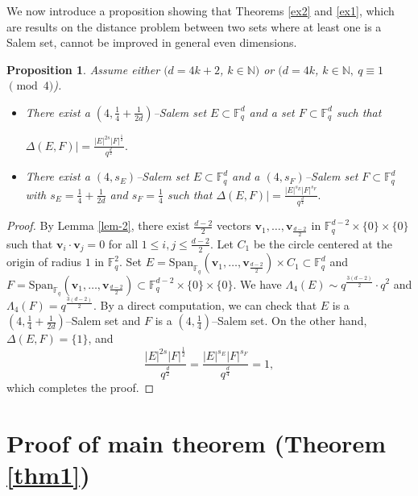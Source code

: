 \documentclass[11pt]{article}
\newtheorem{proposition}[theorem]{Proposition}
\begin{document}
We now introduce a proposition showing that Theorems \ref{ex2} and \ref{ex1}, which are results on the distance problem between two sets where at least one is a Salem set, cannot be improved in general even dimensions.
\begin{proposition}\label{sharptwoset}
      Assume either $(d=4k+2$, $k \in \mathbb{N})$ or $(d=4k$, $k \in \mathbb{N}, ~q \equiv 1$ $\pmod{4}$). 
    \begin{itemize}
        \item There exist a $\left(4, \frac{1}{4}+\frac{1}{2d}\right)$--Salem set $E\subset \mathbb{F}_q^d$ and a set $F\subset \mathbb{F}_q^d$ such that

        $\Delta(E, F)|=\frac{|E|^{2s}|F|^{\frac{1}{2}}}{q^{\frac{d}{2}}}.$
        \item There exist a $\left(4, s_E\right)$--Salem set $E\subset \mathbb{F}_q^d$ and a $\left(4, s_F\right)$--Salem set $F\subset \mathbb{F}_q^d$ with $s_E=\frac{1}{4}+\frac{1}{2d}$ and $s_F=\frac{1}{4}$
        such that
        $\Delta(E, F)|=\frac{|E|^{s_E}|F|^{s_F}}{q^{\frac{d}{4}}}.$
    \end{itemize}
\end{proposition}

\begin{proof}
   By Lemma \ref{lem-2}, there exist $\frac{d-2}{2}$ vectors $\mathbf{v}_1, \ldots, \mathbf{v}_{\frac{d-2}{2}}$ in $\mathbb{F}_q^{d-2}\times \{0\}\times \{0\}$ such that $\mathbf{v}_i\cdot \mathbf{v}_j=0$ for all $1\le i, j\le \frac{d-2}{2}$. Let $C_1$ be the circle centered at the origin of radius $1$ in $\mathbb{F}_q^2$. Set $E=\text{Span}_{\mathbb{F}_q}(\mathbf{v}_1,\dots, \mathbf{v}_{\frac{d-2}{2}})\times C_1\subset \mathbb{F}_q^d$ and $F=\text{Span}_{\mathbb{F}_q}(\mathbf{v}_1,\dots, \mathbf{v}_{\frac{d-2}{2}})\subset \mathbb{F}_q^{d-2}\times \{0\}\times \{0\}$. We have $\Lambda_4(E)\sim q^{\frac{3(d-2)}{2}}\cdot q^2$ and $\Lambda_4(F)=q^{\frac{3(d-2)}{2}}$. By a direct computation, we can check that $E$ is a $\left(4, \frac{1}{4}+\frac{1}{2d}\right)$--Salem set and $F$ is a $\left(4, \frac{1}{4}\right)$--Salem set. On the other hand, $\Delta(E, F)=\{1\}$, and 
   \[\frac{|E|^{2s}|F|^{\frac{1}{2}}}{q^{\frac{d}{2}}}=\frac{|E|^{s_E}|F|^{s_F}}{q^{\frac{d}{4}}}=1,\]
   which completes the proof.
\end{proof}



\section{Proof of main theorem (Theorem \ref{thm1})}\label{secmain}
\end{document}
